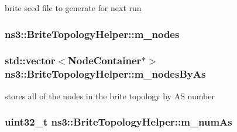 brite seed file to generate for next run 

\subsubsection[{\texorpdfstring{m\+\_\+nodes}{m_nodes}}]{ ns3\+::\+Brite\+Topology\+Helper\+::m\+\_\+nodes\hspace{0.3cm}{\ttfamily [private]}}\hypertarget{classns3_1_1BriteTopologyHelper_aab86f7006d4fa605fddc0bc03d24c8e6}{}\label{classns3_1_1BriteTopologyHelper_aab86f7006d4fa605fddc0bc03d24c8e6}
\subsubsection[{\texorpdfstring{m\+\_\+nodes\+By\+As}{m_nodesByAs}}]{\setlength{\rightskip}{0pt plus 5cm}std\+::vector$<${\bf Node\+Container}$\ast$$>$ ns3\+::\+Brite\+Topology\+Helper\+::m\+\_\+nodes\+By\+As\hspace{0.3cm}{\ttfamily [private]}}\hypertarget{classns3_1_1BriteTopologyHelper_a4c310498d30b134d80a13fd7e56ed686}{}\label{classns3_1_1BriteTopologyHelper_a4c310498d30b134d80a13fd7e56ed686}


stores all of the nodes in the brite topology by AS number 

\subsubsection[{\texorpdfstring{m\+\_\+num\+As}{m_numAs}}]{\setlength{\rightskip}{0pt plus 5cm}uint32\+\_\+t ns3\+::\+Brite\+Topology\+Helper\+::m\+\_\+num\+As\hspace{0.3cm}{\ttfamily [private]}}\hypertarget{classns3_1_1BriteTopologyHelper_a4dc95255dc0dfeeabd5e2fcd1d31cb13}{}\label{classns3_1_1BriteTopologyHelper_a4dc95255dc0dfeeabd5e2fcd1d31cb13}


